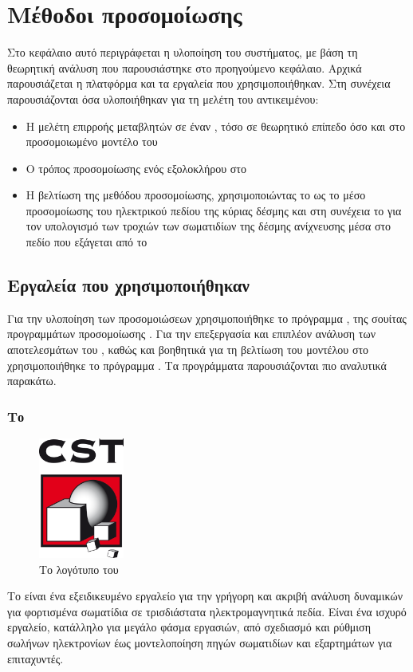 \chapter{Μέθοδοι προσομοίωσης} \label{ch:simulation-methods}
Στο κεφάλαιο αυτό περιγράφεται η υλοποίηση του συστήματος, με βάση τη θεωρητική ανάλυση που παρουσιάστηκε στο προηγούμενο κεφάλαιο. 
Αρχικά παρουσιάζεται η πλατφόρμα και τα εργαλεία που χρησιμοποιήθηκαν.
Στη συνέχεια παρουσιάζονται όσα υλοποιήθηκαν για τη μελέτη του αντικειμένου:
\begin{itemize}
\item Η μελέτη επιρροής μεταβλητών σε έναν , τόσο σε θεωρητικό επίπεδο όσο και στο προσομοιωμένο μοντέλο του 
\item Ο τρόπος προσομοίωσης ενός  εξολοκλήρου στο 
\item Η βελτίωση της μεθόδου προσομοίωσης, χρησιμοποιώντας το  ως το μέσο προσομοίωσης του ηλεκτρικού πεδίου της κύριας δέσμης και στη συνέχεια το  για τον υπολογισμό των τροχιών των σωματιδίων της δέσμης ανίχνευσης μέσα στο πεδίο που εξάγεται από το 
\end{itemize}

\section{Εργαλεία που χρησιμοποιήθηκαν}
Για την υλοποίηση των προσομοιώσεων χρησιμοποιήθηκε το πρόγραμμα , της σουίτας προγραμμάτων προσομοίωσης . 
Για την επεξεργασία και επιπλέον ανάλυση των αποτελεσμάτων του , καθώς και βοηθητικά για τη βελτίωση του μοντέλου στο  χρησιμοποιήθηκε το πρόγραμμα . 
Τα προγράμματα παρουσιάζονται πιο αναλυτικά παρακάτω.

\subsection{Το }
\begin{figure}[tph]
\includegraphics[width=0.25\textwidth]{images/CST-logo}
\centering
\caption{Το λογότυπο του }
\label{img:CSTlogo}
\end{figure}
Το  είναι ένα εξειδικευμένο εργαλείο για την γρήγορη και ακριβή ανάλυση δυναμικών για φορτισμένα σωματίδια σε τρισδιάστατα ηλεκτρομαγνητικά πεδία.
Είναι ένα ισχυρό εργαλείο, κατάλληλο για μεγάλο φάσμα εργασιών, από σχεδιασμό  και ρύθμιση σωλήνων ηλεκτρονίων έως μοντελοποίηση πηγών σωματιδίων και εξαρτημάτων για επιταχυντές.


